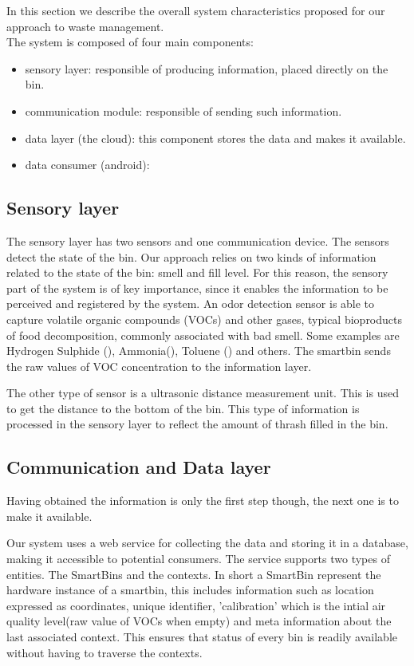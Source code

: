 
In this section we describe the overall system characteristics proposed for our approach to waste management.\\

The system is composed of four main components:
\begin{itemize}
\item sensory layer: responsible of producing information, placed directly on the bin.
\item communication module: responsible of sending such information.
\item data layer (the cloud): this component stores the data and makes it available.
\item data consumer (android):  
\end{itemize}

\subsection{Sensory layer}
The sensory layer has two sensors and one communication device. The sensors detect the state of the bin.
Our approach relies on two kinds of information related to the state of the bin: smell and fill level.
For this reason, the sensory part of the system is of key importance, since it enables the information to be perceived and registered by the system.
An odor detection sensor is able to capture volatile organic compounds (VOCs) and other gases, typical bioproducts of food decomposition, commonly associated with bad smell. 
Some examples are Hydrogen Sulphide (), Ammonia(), Toluene () and others.
The smartbin sends the raw values of VOC concentration to the information layer.

The other type of sensor is a ultrasonic distance measurement unit. This is used to get the distance to the bottom of the bin.
This type of information is processed in the sensory layer to reflect the amount of thrash filled in the bin.

\subsection{Communication and Data layer}
Having obtained the information is only the first step though, the next one is to make it available.

Our system uses a web service for collecting the data and storing it in a database, making it accessible to potential consumers.
The service supports two types of entities. The SmartBins and the contexts.
In short a SmartBin represent the hardware instance of a smartbin, this includes information such as location expressed as coordinates, unique identifier, 'calibration' which is the intial air quality level(raw value of VOCs when empty) and meta information about the last associated context.
This ensures that status of every bin is readily available without having to traverse the contexts.

